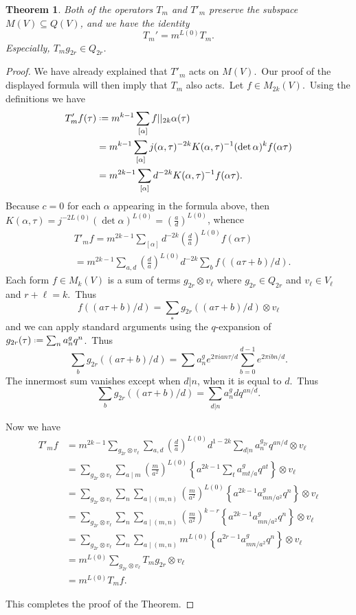 \documentclass[12pt]{amsart}
\theoremstyle{plain}
\newtheorem{thm}{Theorem}[section]
\theoremstyle{definition}
\theoremstyle{remark}
\newcommand*{\df}{\mathrel{\vcenter{\baselineskip0.5ex \lineskiplimit0pt
                     \hbox{\scriptsize.}\hbox{\scriptsize.}}} =}
\begin{document}
\begin{thm}\label{thmHecke} 
Both of the operators $T_m$ and $T'_m$ preserve the subspace $M(V)\subseteq Q(V)$, and we have the identity 
$$ T_m' = m^{L(0)} T_m.$$
Especially,
$T_mg_{2r}\in Q_{2r}$.
\end{thm}
\begin{proof} We have already explained that $T'_m$ acts on $M(V)$.\ Our proof of the displayed formula will then imply that $T_m$ also acts.\ Let $f\in M_{2k}(V)$.\ 
Using the definitions we have
\begin{align*}
T'_m f(\tau)&\df m^{k-1}\sum_{[\alpha]} f||_{2k}\alpha(\tau)\\
&=m^{k-1}\sum_{[\alpha]}j(\alpha, \tau)^{-2k}K(\alpha, \tau)^{-1} (\det\alpha)^kf(\alpha\tau)\\
&=m^{2k-1}\sum_{[\alpha]}d^{-2k}K(\alpha, \tau)^{-1}f(\alpha\tau).
\end{align*}
Because $c=0$ for each $\alpha$ appearing in the formula above, then $K(\alpha, \tau)=j^{-2L(0)}(\det\alpha)^{L(0)}=\left(\frac{a}{d}\right)^{L(0)}$,
whence
\begin{align*}
& T'_m f=m^{2k-1} \sum_{[\alpha]} d^{-2k}\left(\frac{d}{a}\right)^{L(0)}f(\alpha\tau)\\
& = m^{2k-1}\sum_{a, d}  \left(\frac{d}{a}\right)^{L(0)} d^{-2k} 
 \sum_b f((a\tau+b)/d).
\end{align*}
Each form $f \in M_k(V)$ is a sum of terms $g_{2r}\otimes v_{\ell}$ where
$g_{2r}\in Q_{2r}$ and $v_{\ell}\in V_{\ell}$ and $r+\ell=k$.\ Thus
$$f((a\tau+b)/d)=\sum_* g_{2r}((a\tau+b)/d)\otimes v_{\ell}$$
and we can apply standard arguments
using the $q$-expansion of $g_{2r}(\tau)\df\sum_n a^g_nq^n$.\ Thus
$$\sum_b g_{2r}((a\tau+b)/d)=\sum a^g_n e^{2\pi ian\tau/d}\sum_{b=0}^{d-1} e^{2\pi i bn/d}.$$
The innermost sum vanishes except when $d|n$, when it is equal to $d$.\ Thus
$$\sum_b g_{2r}((a\tau+b)/d)=\sum_{d|n}a^g_n d q^{an/d}.$$

Now we have
\begin{align*}
 T'_mf &= m^{2k-1}\sum_{g_{2r}\otimes v_{\ell}}\sum_{a, d} \left(\frac{d}{a}\right)^{L(0)} d^{1-2k}     \sum_{d|n}a^{g_{2r}}_n q^{an/d}\otimes v_{\ell}\\
&=\sum_{g_{2r}\otimes v_{\ell}}\sum_{a\mid m} \left(\frac{m}{a^2}\right)^{L(0)}\left\{ a^{2k-1} \sum_{t} a_{mt/a}^g q^{at}\right\}\otimes v_{\ell}\\
&=\sum_{g_{2r}\otimes v_{\ell}}\sum_n \sum_{a\mid (m, n)} \left(\frac{m}{a^2}\right)^{L(0)}\left\{ a^{2k-1} a_{mn/a^2}^g q^{n}\right\}\otimes v_{\ell}\\
&=\sum_{g_{2r}\otimes v_{\ell}}\sum_n \sum_{a\mid (m, n)} \left(\frac{m}{a^2}\right)^{k-r}\left\{ a^{2k-1} a_{mn/a^2}^g q^{n}\right\}\otimes v_{\ell}\\
&=\sum_{g_{2r}\otimes v_{\ell}}\sum_n \sum_{a\mid (m, n)} m^{L(0)}\left\{ a^{2r-1} a_{mn/a^2}^g q^{n}\right\}\otimes v_{\ell}\\
&=m^{L(0)}\sum_{g_{2r}\otimes v_{\ell}}
T_mg_{2r}\otimes v_{\ell}\\
&=m^{L(0)}T_mf.
\end{align*}

This completes the proof of the Theorem.
\end{proof}
\end{document}
